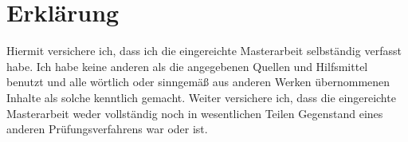 \chapter*{Erklärung}

Hiermit versichere ich, dass ich die eingereichte Masterarbeit selbständig verfasst habe.
Ich habe keine anderen als die angegebenen Quellen und Hilfsmittel benutzt und alle wörtlich oder sinngemäß aus anderen Werken übernommenen Inhalte als solche kenntlich gemacht.
Weiter versichere ich, dass die eingereichte Masterarbeit weder vollständig noch in wesentlichen Teilen Gegenstand eines anderen Prüfungsverfahrens war oder ist.
\vspace{3cm}
\hline
